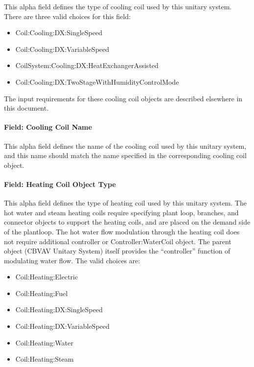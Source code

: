 This alpha field defines the type of cooling coil used by this unitary system. There are three valid choices for this field:

\begin{itemize}
\item
  Coil:Cooling:DX:SingleSpeed
\item
  Coil:Cooling:DX:VariableSpeed
\item
  CoilSystem:Cooling:DX:HeatExchangerAssisted
\item
  Coil:Cooling:DX:TwoStageWithHumidityControlMode
\end{itemize}

The input requirements for these cooling coil objects are described elsewhere in this document.

\paragraph{Field: Cooling Coil Name}\label{field-cooling-coil-name-6}

This alpha field defines the name of the cooling coil used by this unitary system, and this name should match the name specified in the corresponding cooling coil object.

\paragraph{Field: Heating Coil Object Type}\label{field-heating-coil-object-type-8}

This alpha field defines the type of heating coil used by this unitary system. The hot water and steam heating coils require specifying plant loop, branches, and connector objects to support the heating coils, and are placed on the demand side of the plantloop. The hot water flow modulation through the heating coil does not require additional controller or Controller:WaterCoil object. The parent object (CBVAV Unitary System) itself provides the ``controller'' function of modulating water flow. The valid choices are:

\begin{itemize}
\item
  Coil:Heating:Electric
\item
  Coil:Heating:Fuel
\item
  Coil:Heating:DX:SingleSpeed
\item
  Coil:Heating:DX:VariableSpeed
\item
  Coil:Heating:Water
\item
  Coil:Heating:Steam
\end{itemize}

